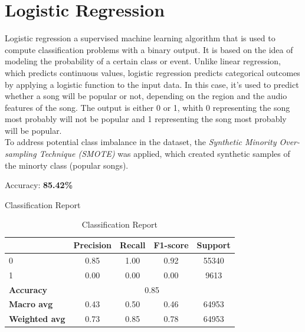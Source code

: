 \newpage


\section{Logistic Regression}
Logistic regression a supervised machine learning algorithm that is used to
compute classification problems with a binary output.
It is based on the idea of modeling the probability of a certain class or event.
Unlike linear regression, which predicts continuous values, logistic regression predicts categorical outcomes by applying a logistic function to the input data.
In this case, it's used to predict
whether a song will be popular or not, depending on the region and the 
audio features of the song. The output is
either 0 or 1, whith 0 representing the song most probably will not be popular and 
1 representing the song most probably will be popular. \\
To address potential class imbalance in the dataset, the \textit{Synthetic Minority Over-sampling Technique (SMOTE)} was applied, which
    created synthetic samples of the minorty class (popular songs). 


Accuracy: \textbf{85.42\%}


Classification Report
\begin{table}[h]
    \centering
    \begin{tabular}{lcccc}
        \toprule
        & \textbf{Precision} & \textbf{Recall} & \textbf{F1-score} & \textbf{Support} \\
        \midrule
        0 & 0.85 & 1.00 & 0.92 & 55340 \\
        1 & 0.00 & 0.00 & 0.00 & 9613 \\
        \midrule
        \textbf{Accuracy} & \multicolumn{4}{c}{0.85} \\
        \textbf{Macro avg} & 0.43 & 0.50 & 0.46 & 64953 \\
        \textbf{Weighted avg} & 0.73 & 0.85 & 0.78 & 64953 \\
        \bottomrule
    \end{tabular}
    \caption{Classification Report}
    \label{tab:classification_report}
\end{table}

